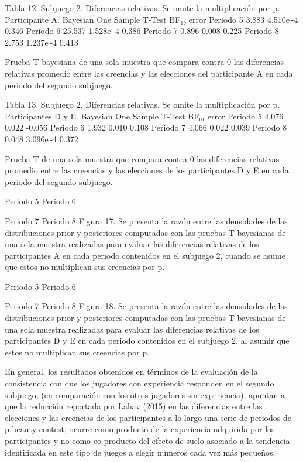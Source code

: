 Tabla 12. Subjuego 2. Diferencias relativas. Se omite la multiplicación por p. Participante A.
Bayesian One Sample T-Test 	
  	BF₁₀ 	error %
Periodo 5 		3.883 		4.510e -4 		0.346 
Periodo 6 		25.537 		1.528e -4 		0.386 
Periodo 7 		0.896 		0.008 		0.225 
Periodo 8 		2.753 		1.237e -4 		0.413 
	
Prueba-T bayesiana de una sola muestra que compara contra 0 las diferencias relativas promedio entre las creencias y las elecciones del participante A en cada periodo del segundo subjuego.

Tabla 13. Subjuego 2. Diferencias relativas. Se omite la multiplicación por p. Participantes D y E.
Bayesian One Sample T-Test 	
  	BF₀₁ 	error %
Periodo 5 		4.076 		0.022 		-0.056 
Periodo 6 		1.932 		0.010 		0.108 
Periodo 7 		4.066 		0.022 		0.039 
Periodo 8 		0.048 		3.096e -4 		0.372 
	
Prueba-T de una sola muestra que compara contra 0 las diferencias relativas promedio entre las creencias y las elecciones de los participantes D y E en cada periodo del segundo subjuego.

  
         Periodo 5					         Periodo 6
  
         Periodo 7					           Periodo 8
Figura 17. Se presenta la razón entre las densidades de las distribuciones prior y posteriores  computadas con las pruebas-T bayesianas de una sola muestra realizadas para evaluar las diferencias relativas de los participantes A en cada periodo contenidos en el subjuego 2, cuando se asume que estos no multiplican sus creencias por p.
  
        Periodo 5					          Periodo 6
  
          Periodo 7					         Periodo 8
Figura 18. Se presenta la razón entre las densidades de las distribuciones prior y posteriores  computadas con las pruebas-T bayesianas de una sola muestra realizadas para evaluar las diferencias relativas de los participantes D y E en cada periodo contenidos en el subjuego 2, al asumir que estos no multiplican sus creencias por p.

En general, los resultados obtenidos en términos de la evaluación de la consistencia con que los jugadores con experiencia responden en el segundo subjuego, (en comparación con los otros jugadores sin experiencia), apuntan a que la reducción reportada por Lahav (2015) en las diferencias entre las elecciones y las creencias de los participantes a lo largo una serie de periodos de p-beauty contest, ocurre como producto de la experiencia adquirida por los participantes y no como co-producto del efecto de suelo asociado a la tendencia identificada en este tipo de juegos a elegir números cada vez más pequeños.

